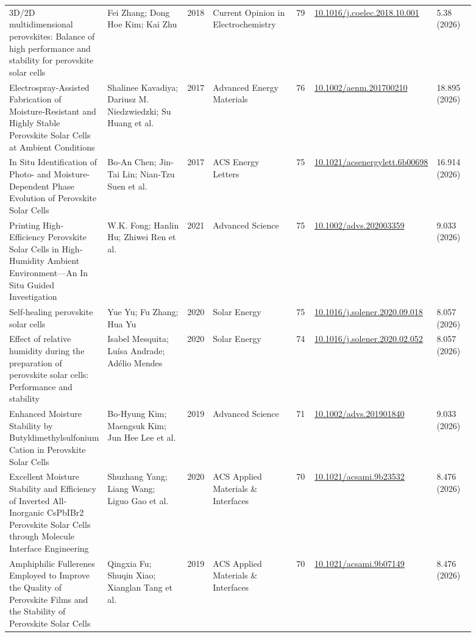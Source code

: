 \documentclass[10pt,a4paper]{article}
\begin{document}
{\begin{longtable}{p{0.197\linewidth}p{0.197\linewidth}p{0.043\linewidth}p{0.197\linewidth}p{0.043\linewidth}p{0.117\linewidth}p{0.098\linewidth}}
3D/2D multidimensional perovskites: Balance of high performance and stability for perovskite solar cells & Fei Zhang; Dong Hoe Kim; Kai Zhu & 2018 & Current Opinion in Electrochemistry & 79 & \href{https://doi.org/10.1016/j.coelec.2018.10.001}{10.1016/j.coelec.2018.10.001} & 5.38 (2026) \\
Electrospray‐Assisted Fabrication of Moisture‐Resistant and Highly Stable Perovskite Solar Cells at Ambient Conditions & Shalinee Kavadiya; Dariusz M. Niedzwiedzki; Su Huang et al. & 2017 & Advanced Energy Materials & 76 & \href{https://doi.org/10.1002/aenm.201700210}{10.1002/aenm.201700210} & 18.895 (2026) \\
In Situ Identification of Photo- and Moisture-Dependent Phase Evolution of Perovskite Solar Cells & Bo‐An Chen; Jin-Tai Lin; Nian‐Tzu Suen et al. & 2017 & ACS Energy Letters & 75 & \href{https://doi.org/10.1021/acsenergylett.6b00698}{10.1021/acsenergylett.6b00698} & 16.914 (2026) \\
Printing High‐Efficiency Perovskite Solar Cells in High‐Humidity Ambient Environment—An In Situ Guided Investigation & W.K. Fong; Hanlin Hu; Zhiwei Ren et al. & 2021 & Advanced Science & 75 & \href{https://doi.org/10.1002/advs.202003359}{10.1002/advs.202003359} & 9.033 (2026) \\
Self-healing perovskite solar cells & Yue Yu; Fu Zhang; Hua Yu & 2020 & Solar Energy & 75 & \href{https://doi.org/10.1016/j.solener.2020.09.018}{10.1016/j.solener.2020.09.018} & 8.057 (2026) \\
Effect of relative humidity during the preparation of perovskite solar cells: Performance and stability & Isabel Mesquita; Luísa Andrade; Adélio Mendes & 2020 & Solar Energy & 74 & \href{https://doi.org/10.1016/j.solener.2020.02.052}{10.1016/j.solener.2020.02.052} & 8.057 (2026) \\
Enhanced Moisture Stability by Butyldimethylsulfonium Cation in Perovskite Solar Cells & Bo‐Hyung Kim; Maengsuk Kim; Jun Hee Lee et al. & 2019 & Advanced Science & 71 & \href{https://doi.org/10.1002/advs.201901840}{10.1002/advs.201901840} & 9.033 (2026) \\
Excellent Moisture Stability and Efficiency of Inverted All-Inorganic CsPbIBr2 Perovskite Solar Cells through Molecule Interface Engineering & Shuzhang Yang; Liang Wang; Liguo Gao et al. & 2020 & ACS Applied Materials \& Interfaces & 70 & \href{https://doi.org/10.1021/acsami.9b23532}{10.1021/acsami.9b23532} & 8.476 (2026) \\
Amphiphilic Fullerenes Employed to Improve the Quality of Perovskite Films and the Stability of Perovskite Solar Cells & Qingxia Fu; Shuqin Xiao; Xianglan Tang et al. & 2019 & ACS Applied Materials \& Interfaces & 70 & \href{https://doi.org/10.1021/acsami.9b07149}{10.1021/acsami.9b07149} & 8.476 (2026) \\

\end{longtable}}
\end{document}

